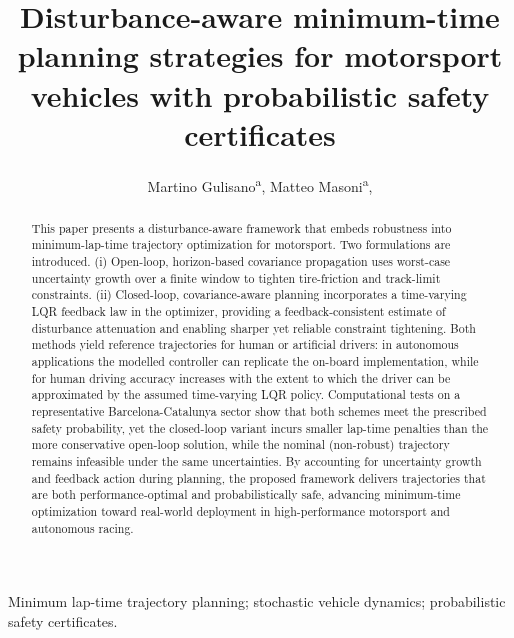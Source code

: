 \documentclass[]{interact}
\theoremstyle{plain}%
\theoremstyle{definition}
\theoremstyle{remark}
\begin{document}

\title{Disturbance-aware minimum-time planning strategies for motorsport vehicles with probabilistic safety certificates}

\author{Martino Gulisano\textsuperscript{a}, Matteo Masoni\textsuperscript{a}, 
}

\maketitle

\begin{abstract}
This paper presents a disturbance-aware framework that embeds robustness into minimum-lap-time trajectory optimization for motorsport. Two formulations are introduced. (i) Open-loop, horizon-based covariance propagation uses worst-case uncertainty growth over a finite window to tighten tire-friction and track-limit constraints. (ii) Closed-loop, covariance-aware planning incorporates a time-varying LQR feedback law in the optimizer, providing a feedback-consistent estimate of disturbance attenuation and enabling sharper yet reliable constraint tightening. Both methods yield reference trajectories for human or artificial drivers: in autonomous applications the modelled controller can replicate the on-board implementation, while for human driving accuracy increases with the extent to which the driver can be approximated by the assumed time-varying LQR policy.  Computational tests on a representative Barcelona-Catalunya sector show that both schemes meet the prescribed safety probability, yet the closed-loop variant incurs smaller lap-time penalties than the more conservative open-loop solution, while the nominal (non-robust) trajectory remains infeasible under the same uncertainties.
By accounting for uncertainty growth and feedback action during planning, the proposed framework delivers trajectories that are both performance-optimal and probabilistically safe, advancing minimum-time optimization toward real-world deployment in high-performance motorsport and autonomous racing.
\end{abstract}

\begin{keywords}
Minimum lap-time trajectory planning; stochastic vehicle dynamics; probabilistic safety certificates.
\end{keywords}
\end{document}
